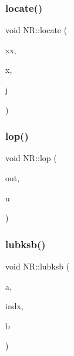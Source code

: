 \mbox{\label{namespaceNR_a219cd98096988ead11bcba867d300ebc}} 
\subsubsection{\texorpdfstring{locate()}{locate()}}
{\footnotesize\ttfamily void N\+R\+::locate (\begin{DoxyParamCaption}\item[{\mbox{\hyperlink{namespaceNR_a9f943da53862537c552e2a770cb170ae}{Vec\+\_\+\+I\+\_\+\+DP}} \&}]{xx,  }\item[{const \mbox{\hyperlink{namespaceNR_af6ff762dd605ff477b8e52387253a02a}{DP}}}]{x,  }\item[{int \&}]{j }\end{DoxyParamCaption})}

\mbox{\label{namespaceNR_a13418bcc862bf5ed4c010126e8cf8028}} 
\subsubsection{\texorpdfstring{lop()}{lop()}}
{\footnotesize\ttfamily void N\+R\+::lop (\begin{DoxyParamCaption}\item[{\mbox{\hyperlink{namespaceNR_adc1f8da33094b6bbeb1f5f899515ce54}{Mat\+\_\+\+O\+\_\+\+DP}} \&}]{out,  }\item[{\mbox{\hyperlink{namespaceNR_a2b8abfda8fffad6ba0a1b5a4c0773dbf}{Mat\+\_\+\+I\+\_\+\+DP}} \&}]{u }\end{DoxyParamCaption})}

\mbox{\label{namespaceNR_a1455a894979c7f2eaf3ef611a611cc42}} 
\subsubsection{\texorpdfstring{lubksb()}{lubksb()}}
{\footnotesize\ttfamily void N\+R\+::lubksb (\begin{DoxyParamCaption}\item[{\mbox{\hyperlink{namespaceNR_a2b8abfda8fffad6ba0a1b5a4c0773dbf}{Mat\+\_\+\+I\+\_\+\+DP}} \&}]{a,  }\item[{\mbox{\hyperlink{namespaceNR_ae67ce7dc86a8a64a7ce73c3c030ff610}{Vec\+\_\+\+I\+\_\+\+I\+NT}} \&}]{indx,  }\item[{\mbox{\hyperlink{namespaceNR_ab293e06a6bf799d8a7ed932b6852bcb8}{Vec\+\_\+\+I\+O\+\_\+\+DP}} \&}]{b }\end{DoxyParamCaption})}

